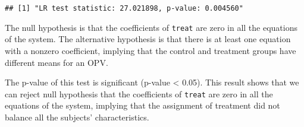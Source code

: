 \documentclass[
]{article}
\newenvironment{Shaded}{\begin{snugshade}}{\end{snugshade}}
\newcommand{\AttributeTok}[1]{\textcolor[rgb]{0.13,0.29,0.53}{#1}}
\newcommand{\CommentTok}[1]{\textcolor[rgb]{0.56,0.35,0.01}{\textit{#1}}}
\newcommand{\ConstantTok}[1]{\textcolor[rgb]{0.56,0.35,0.01}{#1}}
\newcommand{\ControlFlowTok}[1]{\textcolor[rgb]{0.13,0.29,0.53}{\textbf{#1}}}
\newcommand{\DecValTok}[1]{\textcolor[rgb]{0.00,0.00,0.81}{#1}}
\newcommand{\FunctionTok}[1]{\textcolor[rgb]{0.13,0.29,0.53}{\textbf{#1}}}
\newcommand{\NormalTok}[1]{#1}
\newcommand{\OtherTok}[1]{\textcolor[rgb]{0.56,0.35,0.01}{#1}}
\newcommand{\SpecialCharTok}[1]{\textcolor[rgb]{0.81,0.36,0.00}{\textbf{#1}}}
\newcommand{\StringTok}[1]{\textcolor[rgb]{0.31,0.60,0.02}{#1}}
\begin{document}
\begin{Shaded}
\end{Shaded}

\begin{verbatim}
## [1] "LR test statistic: 27.021898, p-value: 0.004560"
\end{verbatim}

The null hypothesis is that the coefficients of \texttt{treat} are zero
in all the equations of the system. The alternative hypothesis is that
there is at least one equation with a nonzero coefficient, implying that
the control and treatment groups have different means for an OPV.

The p-value of this test is significant (p-value \textless{} 0.05). This
result shows that we can reject null hypothesis that the coefficients of
\texttt{treat} are zero in all the equations of the system, implying
that the assignment of treatment did not balance all the subjects'
characteristics.
\end{document}
